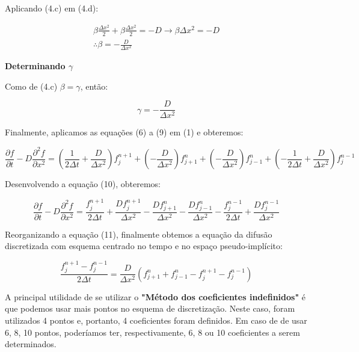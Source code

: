 \documentclass[11pt]{article}
\begin{document}
Aplicando (4.c) em (4.d):

\begin{equation}
    \begin{aligned}
        \beta{\frac{\Delta{x^2}}{2}} + \beta{\frac{\Delta{x^2}}{2}} = -D \to \beta{\Delta{x^2}} = -D \\ 
        \therefore \beta = -\frac{D}{\Delta{x^2}}
    \end{aligned}
\end{equation}

\textbf{Determinando \(\gamma\)}

Como de (4.c) \(\beta = \gamma\), então:

\begin{equation}
    \gamma = -\frac{D}{\Delta{x^2}}
\end{equation}

Finalmente, aplicamos as equações (6) a (9) em (1) e obteremos:

\begin{equation}
\frac{\partial{f}}{\partial{t}} - D\frac{\partial^2{f}}{\partial{x^2}} = 
    (\frac{1}{2\Delta{t}} + \frac{D}{\Delta{x^2}})f^{n+1}_{j} + 
    (-\frac{D}{\Delta{x^2}})f^{n}_{j+1} + 
    (-\frac{D}{\Delta{x^2}})f^{n}_{j-1} + 
    (-\frac{1}{2\Delta{t}} + \frac{D}{\Delta{x^2}})f^{n-1}_{j}
\end{equation}

Desenvolvendo a equação (10), obteremos:

\begin{equation}
    \frac{\partial{f}}{\partial{t}} - D\frac{\partial^2{f}}{\partial{x^2}} = 
    \frac{f^{n+1}_{j}}{2\Delta{t}} + \frac{Df^{n+1}_{j}}{\Delta{x^2}} -
    \frac{Df^{n}_{j+1}}{\Delta{x^2}} - \frac{Df^{n}_{j-1}}{\Delta{x^2}} -
    \frac{f^{n-1}_{j}}{2\Delta{t}} + \frac{Df^{n-1}_{j}}{\Delta{x^2}} 
\end{equation}

Reorganizando a equação (11), finalmente obtemos a equação da difusão
discretizada com esquema centrado no tempo e no espaço pseudo-implícito:

\begin{equation}
    \frac{f^{n+1}_{j} - f^{n-1}_{j}}{2\Delta{t}} = 
    \frac{D}{\Delta{x^2}}(f^{n}_{j+1} + f^{n}_{j-1} - f^{n+1}_{j} - f^{n-1}_{j})
\end{equation}

A principal utilidade de se utilizar o \textbf{"Método dos coeficientes
indefinidos"} é que podemos usar mais pontos no esquema de
discretização. Neste caso, foram utilizados 4 pontos e, portanto, 4
coeficientes foram definidos. Em caso de de usar 6, 8, 10 pontos,
poderíamos ter, respectivamente, 6, 8 ou 10 coeficientes a serem
determinados.
\end{document}
